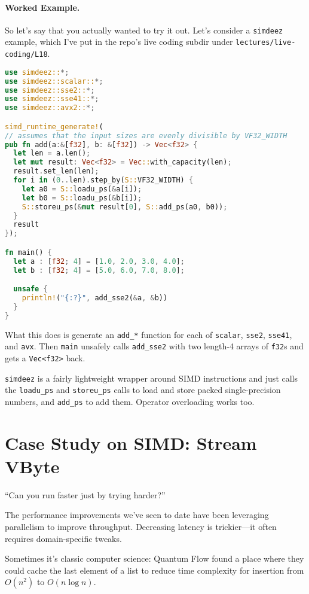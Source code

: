 \paragraph{Worked Example.} So let's say that you actually wanted to try it out. Let's consider a \texttt{simdeez} example, which I've put in the repo's live coding subdir under \texttt{lectures/live-coding/L18}.

\begin{lstlisting}[language=Rust]
use simdeez::*;
use simdeez::scalar::*;
use simdeez::sse2::*;
use simdeez::sse41::*;
use simdeez::avx2::*;

simd_runtime_generate!(
// assumes that the input sizes are evenly divisible by VF32_WIDTH
pub fn add(a:&[f32], b: &[f32]) -> Vec<f32> {
  let len = a.len();
  let mut result: Vec<f32> = Vec::with_capacity(len);
  result.set_len(len);
  for i in (0..len).step_by(S::VF32_WIDTH) {
    let a0 = S::loadu_ps(&a[i]);
    let b0 = S::loadu_ps(&b[i]);
    S::storeu_ps(&mut result[0], S::add_ps(a0, b0));
  }
  result
});

fn main() {
  let a : [f32; 4] = [1.0, 2.0, 3.0, 4.0];
  let b : [f32; 4] = [5.0, 6.0, 7.0, 8.0];

  unsafe {
    println!("{:?}", add_sse2(&a, &b))
  }
}
\end{lstlisting}
What this does is generate an \texttt{add\_*} function for each of \texttt{scalar},
\texttt{sse2}, \texttt{sse41}, and \texttt{avx}. Then \texttt{main}
unsafely calls \texttt{add\_sse2} with two length-4 arrays of \texttt{f32}s and
gets a \texttt{Vec<f32>} back.

\texttt{simdeez} is a fairly lightweight wrapper around SIMD instructions and just
calls the \texttt{loadu\_ps} and \texttt{storeu\_ps} calls to load and store
packed single-precision numbers, and \texttt{add\_ps} to add them. Operator overloading
works too.

\section*{Case Study on SIMD: Stream VByte }

\hfill ``Can you run faster just by trying harder?''

The performance improvements we've seen to date have been leveraging parallelism
to improve throughput. Decreasing latency is trickier---it often requires domain-specific
tweaks.

Sometimes it's classic computer science: Quantum Flow found a place
where they could cache the last element of a list to reduce time
complexity for insertion from $O(n^2)$ to $O(n \log n)$.

